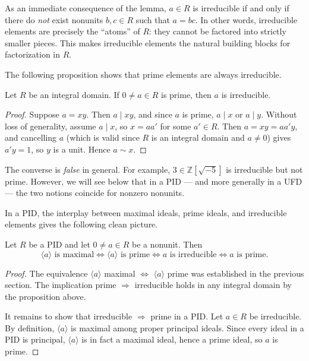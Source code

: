 \begin{remark}
As an immediate consequence of the lemma, $a \in R$ is irreducible if and only if there do \emph{not} exist nonunits $b, c \in R$ such that $a = bc$. In other words, irreducible elements are precisely the ``atoms'' of $R$: they cannot be factored into strictly smaller pieces. This makes irreducible elements the natural building blocks for factorization in $R$.
\end{remark}

The following proposition shows that prime elements are always irreducible.

\begin{proposition}
Let $R$ be an integral domain. If $0 \neq a \in R$ is prime, then $a$ is irreducible.
\end{proposition}

\begin{proof}
Suppose $a = xy$. Then $a \mid xy$, and since $a$ is prime, $a \mid x$ or $a \mid y$. Without loss of generality, assume $a \mid x$, so $x = a a'$ for some $a' \in R$. Then $a = xy = a a' y$, and cancelling $a$ (which is valid since $R$ is an integral domain and $a \neq 0$) gives $a'y = 1$, so $y$ is a unit. Hence $a \sim x$.
\end{proof}

\begin{remark}
The converse is \emph{false} in general. For example, $3 \in \mathbb{Z}[\sqrt{-5}]$ is irreducible but not prime. However, we will see below that in a PID — and more generally in a UFD — the two notions coincide for nonzero nonunits.
\end{remark}

In a PID, the interplay between maximal ideals, prime ideals, and irreducible elements gives the following clean picture.

\begin{proposition}
Let $R$ be a PID and let $0 \neq a \in R$ be a nonunit. Then
\[
\langle a \rangle \text{ is maximal} \iff \langle a \rangle \text{ is prime} \iff a \text{ is irreducible} \iff a \text{ is prime.}
\]
\end{proposition}

\begin{proof}
The equivalence $\langle a \rangle$ maximal $\Leftrightarrow$ $\langle a \rangle$ prime was established in the previous section. The implication prime $\Rightarrow$ irreducible holds in any integral domain by the proposition above.

It remains to show that irreducible $\Rightarrow$ prime in a PID. Let $a \in R$ be irreducible. By definition, $\langle a \rangle$ is maximal among proper principal ideals. Since every ideal in a PID is principal, $\langle a \rangle$ is in fact a maximal ideal, hence a prime ideal, so $a$ is prime.
\end{proof}

